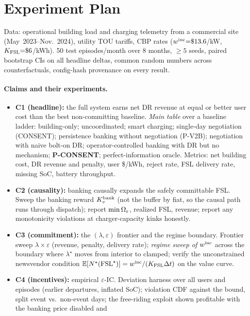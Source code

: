 \section{Experiment Plan}\label{sec:expplan}

Data: operational building load and charging telemetry from a commercial
site (May~2023--Nov.~2024), utility TOU tariffs, CBP rates
($w^{\mathrm{inc}}{=}\$13.6$/kW, $K_{\mathrm{FSL}}{=}\$6$/kWh). 50 test episodes/month over 8
months, $\geq 5$ seeds, paired bootstrap CIs on all headline deltas,
common random numbers across counterfactuals, config-hash provenance on
every result.

\paragraph{Claims and their experiments.}
\begin{itemize}
\item \textbf{C1 (headline):} the full system earns net DR revenue at
equal or better user cost than the best non-committing baseline.
\emph{Main table} over a baseline ladder: building-only; uncoordinated;
smart charging; single-day negotiation (CONSENT); persistence banking
without negotiation (P-V2B); negotiation with naive bolt-on DR;
operator-controlled banking with DR but no mechanism; \textbf{P-CONSENT};
perfect-information oracle. Metrics: net building cost, DR revenue and
penalty, user \$/kWh, reject rate, FSL delivery rate, missing SoC,
battery throughput.
\item \textbf{C2 (causality):} banking causally expands the safely
committable FSL. Sweep the banking reward $K^{\mathrm{bank}}_{v}$ (not the buffer by
fiat, so the causal path runs through dispatch); report
$\min\Omega_{\varepsilon}$, realized FSL, revenue; report any monotonicity violations
at charger-capacity kinks honestly.
\item \textbf{C3 (commitment):} the $(\lambda,\varepsilon)$ frontier and
the regime boundary. Frontier sweep $\lambda \times \varepsilon$
(revenue, penalty, delivery rate); \emph{regime sweep of $w^{\mathrm{inc}}$} across
the boundary where $\lambda^{\star}$ moves from interior to clamped;
verify the unconstrained newsvendor condition
$\mathbb{E}[N^{\star}(\mathrm{FSL}^{\star})] = w^{\mathrm{inc}}/(K_{\mathrm{FSL}}\Delta t)$ on the value curve.
\item \textbf{C4 (incentives):} empirical $\varepsilon$-IC. Deviation
harness over all users and episodes (earlier departures, inflated SoC);
violation CDF against the bound, split event vs.\ non-event days; the
free-riding exploit shown profitable with the banking price disabled and

\end{itemize}
